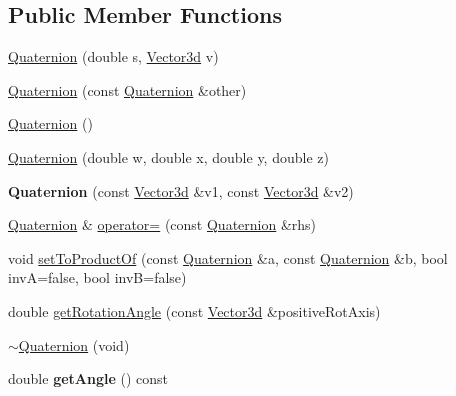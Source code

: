 \subsection*{Public Member Functions}
\begin{DoxyCompactItemize}
\item 
\hyperlink{classCartWheel_1_1Math_1_1Quaternion_a50893666ee58437ff454a27f635fcc56}{Quaternion} (double s, \hyperlink{classCartWheel_1_1Math_1_1Vector3d}{Vector3d} v)
\item 
\hyperlink{classCartWheel_1_1Math_1_1Quaternion_af0ff54587a13b829e9c8cb704528185b}{Quaternion} (const \hyperlink{classCartWheel_1_1Math_1_1Quaternion}{Quaternion} \&other)
\item 
\hyperlink{classCartWheel_1_1Math_1_1Quaternion_afd36229554b32c7af256edaed72acc78}{Quaternion} ()
\item 
\hyperlink{classCartWheel_1_1Math_1_1Quaternion_add84f474836720f819997c46d4125b78}{Quaternion} (double w, double x, double y, double z)
\item 
\hypertarget{classCartWheel_1_1Math_1_1Quaternion_ad07d605a931f840c239502cca22c4fa9}{
{\bfseries Quaternion} (const \hyperlink{classCartWheel_1_1Math_1_1Vector3d}{Vector3d} \&v1, const \hyperlink{classCartWheel_1_1Math_1_1Vector3d}{Vector3d} \&v2)}
\label{classCartWheel_1_1Math_1_1Quaternion_ad07d605a931f840c239502cca22c4fa9}

\item 
\hyperlink{classCartWheel_1_1Math_1_1Quaternion}{Quaternion} \& \hyperlink{classCartWheel_1_1Math_1_1Quaternion_a60801cdb44f546258ae4755d689532a2}{operator=} (const \hyperlink{classCartWheel_1_1Math_1_1Quaternion}{Quaternion} \&rhs)
\item 
void \hyperlink{classCartWheel_1_1Math_1_1Quaternion_a16760d63cc452ac36d9bdb200a1d8374}{setToProductOf} (const \hyperlink{classCartWheel_1_1Math_1_1Quaternion}{Quaternion} \&a, const \hyperlink{classCartWheel_1_1Math_1_1Quaternion}{Quaternion} \&b, bool invA=false, bool invB=false)
\item 
double \hyperlink{classCartWheel_1_1Math_1_1Quaternion_aa6869c5ed6433090dce37a17d2060625}{getRotationAngle} (const \hyperlink{classCartWheel_1_1Math_1_1Vector3d}{Vector3d} \&positiveRotAxis)
\item 
\hyperlink{classCartWheel_1_1Math_1_1Quaternion_a3ad9a74cb7be18ff500ea3628bb0adf0}{$\sim$Quaternion} (void)
\item 
\hypertarget{classCartWheel_1_1Math_1_1Quaternion_a4756c9e9f9674615911f8c18ce421b19}{
double {\bfseries getAngle} () const }
\label{classCartWheel_1_1Math_1_1Quaternion_a4756c9e9f9674615911f8c18ce421b19}


\end{DoxyCompactItemize}
